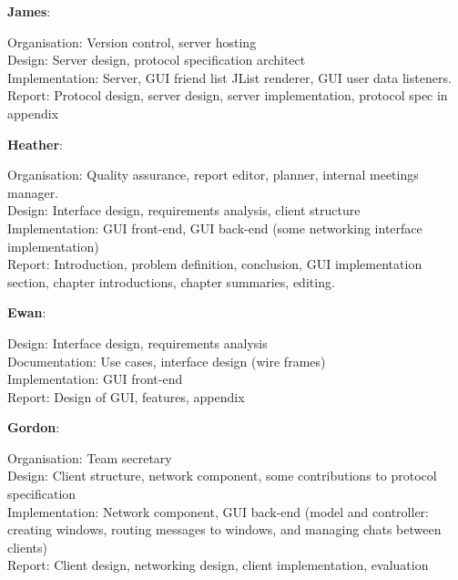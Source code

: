 \label{sumlog}

{\bf James}:

Organisation: Version control, server hosting\\
Design: Server design, protocol specification architect\\
Implementation: Server, GUI friend list JList renderer, GUI user data listeners.\\
Report: Protocol design, server design, server implementation, protocol spec in appendix

{\bf Heather}:

Organisation: Quality assurance, report editor, planner, internal meetings manager.\\
Design: Interface design, requirements analysis, client structure\\
Implementation: GUI front-end, GUI back-end (some networking interface implementation)\\
Report: Introduction, problem definition, conclusion, GUI implementation section, chapter introductions, chapter summaries, editing. 

{\bf Ewan}:

Design: Interface design, requirements analysis\\
Documentation: Use cases, interface design (wire frames)\\
Implementation: GUI front-end\\
Report: Design of GUI, features, appendix

{\bf Gordon}:

Organisation: Team secretary\\
Design: Client structure, network component, some contributions to protocol specification\\
Implementation: Network component, GUI back-end (model and controller: creating windows, routing messages to windows, and managing chats between clients)\\
Report: Client design, networking design, client implementation, evaluation
